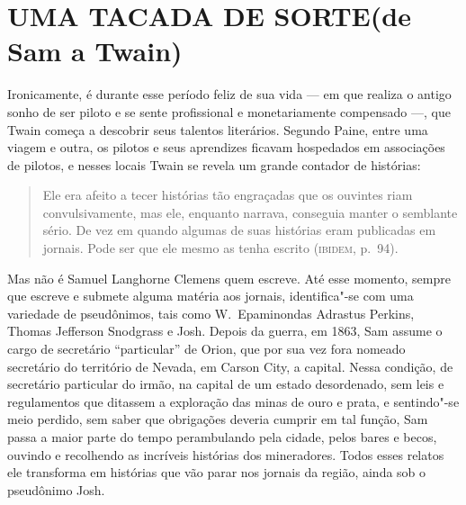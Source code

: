 \section{UMA TACADA DE SORTE\break (de Sam a Twain)}

Ironicamente, é durante esse período feliz de sua vida --- em que realiza
o antigo sonho de ser piloto e se sente profissional e monetariamente
compensado ---, que Twain começa a descobrir seus talentos literários.
Segundo Paine, entre uma viagem e outra, os pilotos e seus aprendizes
ficavam hospedados em associações de pilotos, e nesses locais Twain se
revela um grande contador de histórias:

\begin{quote}
Ele era afeito a
tecer histórias tão engraçadas que os ouvintes riam convulsivamente, mas
ele, enquanto narrava, conseguia manter o semblante sério. De vez em
quando algumas de suas histórias eram publicadas em jornais. Pode ser
que ele mesmo as tenha escrito (\textsc{ibidem}, p.~94).
\end{quote}

Mas não é Samuel Langhorne Clemens quem escreve. Até esse momento, sempre que
escreve e submete alguma matéria aos jornais, identifica"-se com uma
variedade de pseudônimos, tais como W.~Epaminondas Adrastus Perkins,
Thomas Jefferson Snodgrass e Josh. Depois da guerra, em 1863, Sam assume o
cargo de secretário ``particular'' de
Orion, que por sua vez fora nomeado secretário do território de Nevada,
em Carson City, a capital. Nessa condição, de secretário particular do
irmão, na capital de um estado desordenado, sem leis e regulamentos que
ditassem a exploração das minas de ouro e prata, e sentindo"-se meio
perdido, sem saber que obrigações deveria cumprir em tal função, Sam passa
a maior parte do tempo perambulando pela cidade, pelos bares e becos,
ouvindo e recolhendo as incríveis histórias dos mineradores. Todos
esses relatos ele transforma em histórias que vão parar nos jornais da
região, ainda sob o pseudônimo Josh.

